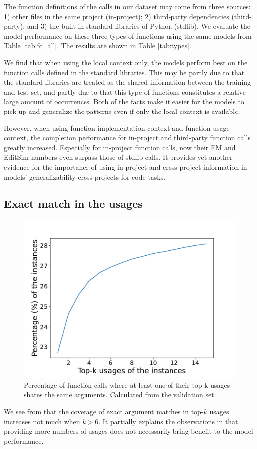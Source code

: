 The function definitions of the calls in our dataset may come from three sources: 
1) other files in the same project (in-project); 
2) third-party dependencies (third-party); and
3) the built-in standard libraries of Python (stdlib). 
We evaluate the model performance on these three types of functions using the same models from Table \ref{tab:fc_all}. 
The results are shown in Table \ref{tab:types}. 

We find that when using the local context only, the models perform best on the function calls defined in the standard libraries. 
This may be partly due to that the standard libraries are treated as the shared information between the training and test set, and partly due to that this type of functions constitutes a relative large amount of occurrences. 
Both of the facts make it easier for the models to pick up and generalize the patterns even if only the local context is available.

However, when using function implementation context and function usage context, the completion performance for in-project and third-party function calls greatly increased. 
Especially for in-project function calls, now their EM and EditSim numbers even surpass those of stdlib calls.
It provides yet another evidence for the importance of using in-project and cross-project information in models' generalizability cross projects for code tasks. 

\subsection{Exact match in the usages} 
\label{sec:saturate}
\begin{figure}[bt]
\centering 
\includegraphics[width=0.5\linewidth]{fig/curve.pdf}
\caption{Percentage of function calls where at least one of their top-k usages shares the same arguments. Calculated from the \CallArgs validation set.}
\label{fig:curve}
\end{figure}

We see from  that the coverage of exact argument matches in top-$k$ usages increases not much when $k > 6$. 
It partially explains the observations in  that providing more numbers of usages does not necessarily bring benefit to the model performance.